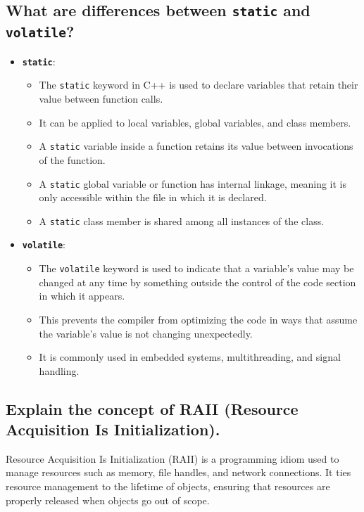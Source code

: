\subsection{What are differences between \texttt{static} and \texttt{volatile}?}
\begin{itemize}
    \item \textbf{\texttt{static}}:
    \begin{itemize}
        \item The \texttt{static} keyword in C++ is used to declare variables that retain their value between function calls.
        \item It can be applied to local variables, global variables, and class members.
        \item A \texttt{static} variable inside a function retains its value between invocations of the function.
        \item A \texttt{static} global variable or function has internal linkage, meaning it is only accessible within the file in which it is declared.
        \item A \texttt{static} class member is shared among all instances of the class.
    \end{itemize}
    
    \item \textbf{\texttt{volatile}}:
    \begin{itemize}
        \item The \texttt{volatile} keyword is used to indicate that a variable's value may be changed at any time by something outside the control of the code section in which it appears.
        \item This prevents the compiler from optimizing the code in ways that assume the variable's value is not changing unexpectedly.
        \item It is commonly used in embedded systems, multithreading, and signal handling.
    \end{itemize}
\end{itemize}

\subsection{Explain the concept of RAII (Resource Acquisition Is Initialization).}
Resource Acquisition Is Initialization (RAII) is a programming idiom used to manage resources such as memory, file handles, and network connections. It ties resource management to the lifetime of objects, ensuring that resources are properly released when objects go out of scope.

